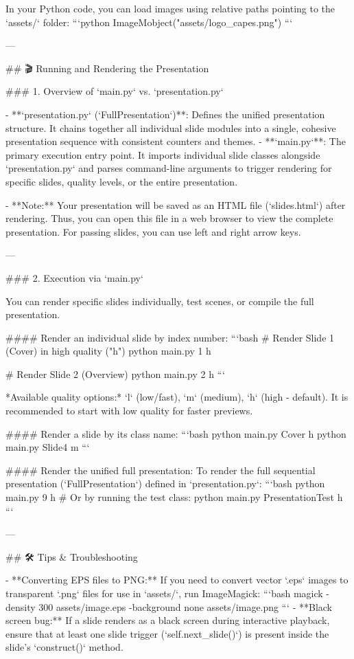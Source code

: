 In your Python code, you can load images using relative paths pointing to the `assets/` folder:
```python
ImageMobject("assets/logo_capes.png")
```

---

## 🎬 Running and Rendering the Presentation

### 1. Overview of `main.py` vs. `presentation.py`

- **`presentation.py` (`FullPresentation`)**: Defines the unified presentation structure. It chains together all individual slide modules into a single, cohesive presentation sequence with consistent counters and themes.
- **`main.py`**: The primary execution entry point. It imports individual slide classes alongside `presentation.py` and parses command-line arguments to trigger rendering for specific slides, quality levels, or the entire presentation.

- **Note:** Your presentation will be saved as an HTML file (`slides.html`) after rendering. Thus, you can open this file in a web browser to view the complete presentation. For passing slides, you can use left and right arrow keys.

---

### 2. Execution via `main.py`

You can render specific slides individually, test scenes, or compile the full presentation.

#### Render an individual slide by index number:
```bash
# Render Slide 1 (Cover) in high quality ("h")
python main.py 1 h

# Render Slide 2 (Overview)
python main.py 2 h
```

*Available quality options:* `l` (low/fast), `m` (medium), `h` (high - default). It is recommended to start with low quality for faster previews.

#### Render a slide by its class name:
```bash
python main.py Cover h
python main.py Slide4 m
```

#### Render the unified full presentation:
To render the full sequential presentation (`FullPresentation`) defined in `presentation.py`:
```bash
python main.py 9 h
# Or by running the test class:
python main.py PresentationTest h
```

---

## 🛠️ Tips & Troubleshooting

- **Converting EPS files to PNG:**
  If you need to convert vector `.eps` images to transparent `.png` files for use in `assets/`, run ImageMagick:
  ```bash
  magick -density 300 assets/image.eps -background none assets/image.png
  ```
- **Black screen bug:**
  If a slide renders as a black screen during interactive playback, ensure that at least one slide trigger (`self.next_slide()`) is present inside the slide's `construct()` method.